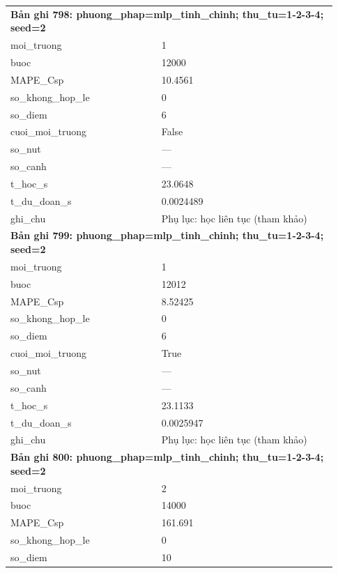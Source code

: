 \begin{longtable}{p{0.43\linewidth}p{0.50\linewidth}}
\midrule
\multicolumn{2}{p{0.95\linewidth}}{\textbf{Bản ghi 798: phuong\_phap=mlp\_tinh\_chinh; thu\_tu=1-2-3-4; seed=2}} \\
moi\_\allowbreak truong & 1 \\
buoc & 12000 \\
MAPE\_\allowbreak Csp & 10.4561 \\
so\_\allowbreak khong\_\allowbreak hop\_\allowbreak le & 0 \\
so\_\allowbreak diem & 6 \\
cuoi\_\allowbreak moi\_\allowbreak truong & False \\
so\_\allowbreak nut & — \\
so\_\allowbreak canh & — \\
t\_\allowbreak hoc\_\allowbreak s & 23.0648 \\
t\_\allowbreak du\_\allowbreak doan\_\allowbreak s & 0.0024489 \\
ghi\_\allowbreak chu & Phụ lục: học liên tục (tham khảo) \\
\midrule
\multicolumn{2}{p{0.95\linewidth}}{\textbf{Bản ghi 799: phuong\_phap=mlp\_tinh\_chinh; thu\_tu=1-2-3-4; seed=2}} \\
moi\_\allowbreak truong & 1 \\
buoc & 12012 \\
MAPE\_\allowbreak Csp & 8.52425 \\
so\_\allowbreak khong\_\allowbreak hop\_\allowbreak le & 0 \\
so\_\allowbreak diem & 6 \\
cuoi\_\allowbreak moi\_\allowbreak truong & True \\
so\_\allowbreak nut & — \\
so\_\allowbreak canh & — \\
t\_\allowbreak hoc\_\allowbreak s & 23.1133 \\
t\_\allowbreak du\_\allowbreak doan\_\allowbreak s & 0.0025947 \\
ghi\_\allowbreak chu & Phụ lục: học liên tục (tham khảo) \\
\midrule
\multicolumn{2}{p{0.95\linewidth}}{\textbf{Bản ghi 800: phuong\_phap=mlp\_tinh\_chinh; thu\_tu=1-2-3-4; seed=2}} \\
moi\_\allowbreak truong & 2 \\
buoc & 14000 \\
MAPE\_\allowbreak Csp & 161.691 \\
so\_\allowbreak khong\_\allowbreak hop\_\allowbreak le & 0 \\
so\_\allowbreak diem & 10 \\

\end{longtable}
